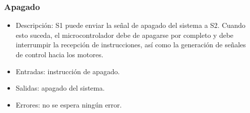 \subsubsection{Apagado}
\begin{itemize}
    \item Descripción: \ac{S1} puede enviar la señal de apagado del sistema a \ac{S2}. Cuando esto suceda, el microcontrolador debe de apagarse por completo y debe interrumpir la recepción de instrucciones, así como la generación de señales de control hacia los motores.
    \item Entradas: instrucción de apagado.
    \item Salidas: apagado del sistema.
    \item Errores: no se espera ningún error.
\end{itemize}


